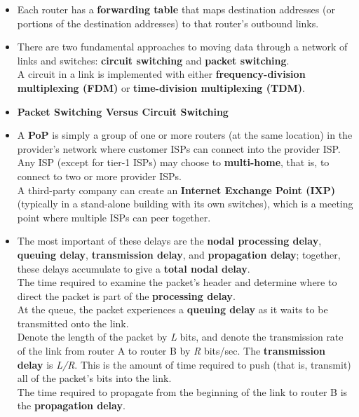 \begin{itemize}
\item Each router has a \textbf{forwarding table} that maps destination addresses (or portions of the destination addresses) to that router's outbound links.

\item There are two fundamental approaches to moving data through a network of links and switches: \textbf{circuit switching} and \textbf{packet switching}.\\A circuit in a link is implemented with either \textbf{frequency-division multiplexing (FDM)} or \textbf{time-division multiplexing (TDM)}.

\item \textbf{Packet Switching Versus Circuit Switching}

\item A \textbf{PoP} is simply a group of one or more routers (at the same location) in the provider's network where customer ISPs can connect into the provider ISP.\\Any ISP (except for tier-1 ISPs) may choose to \textbf{multi-home}, that is, to connect to two or more provider ISPs.\\A third-party company can create an \textbf{Internet Exchange Point (IXP)} (typically in a stand-alone building with its own switches), which is a meeting point where multiple ISPs can peer together.

\item The most important of these delays are the \textbf{nodal processing delay}, \textbf{queuing delay}, \textbf{transmission delay}, and \textbf{propagation delay}; together, these delays accumulate to give a \textbf{total nodal delay}.\\The time required to examine the packet's header and determine where to direct the packet is part of the \textbf{processing delay}.\\At the queue, the packet experiences a \textbf{queuing delay} as it waits to be transmitted onto the link.\\Denote the length of the packet by \textit{L} bits, and denote the transmission rate of the link from router A to router B by \textit{R} bits/sec. The \textbf{transmission delay} is \textit{L/R}. This is the amount of time required to push (that is, transmit) all of the packet's bits into the link.\\The time required to propagate from the beginning of the link to router B is the \textbf{propagation delay}.


\end{itemize}

